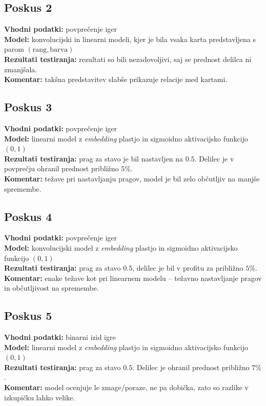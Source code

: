 \documentclass[a4paper,12pt]{article}
\begin{document}
\subsection{Poskus 2}
\textbf{Vhodni podatki:} povprečenje iger \\
\textbf{Model:} konvolucijski in linearni modeli, kjer je bila vsaka karta predstavljena s parom $(\text{rang}, \text{barva})$ \\
\textbf{Rezultati testiranja:} rezultati so bili nezadovoljivi, saj se prednost delilca ni zmanjšala. \\
\textbf{Komentar:} takšna predstavitev slabše prikazuje relacije med kartami.

\subsection{Poskus 3}
\textbf{Vhodni podatki:} povprečenje iger \\
\textbf{Model:} linearni model z \textit{embedding} plastjo in sigmoidno aktivacijsko funkcijo $(0,1)$ \\
\textbf{Rezultati testiranja:} prag za stavo je bil nastavljen na $0.5$. Delilec je v povprečju ohranil prednost približno $5\%$. \\
\textbf{Komentar:} težave pri nastavljanju pragov, model je bil zelo občutljiv na manjše spremembe.

\subsection{Poskus 4}
\textbf{Vhodni podatki:} povprečenje iger \\
\textbf{Model:} konvolucijski model z \textit{embedding} plastjo in sigmoidno aktivacijsko funkcijo $(0,1)$ \\
\textbf{Rezultati testiranja:} prag za stavo $0.5$, delilec je bil v profitu za približno $5\%$. \\
\textbf{Komentar:} enake težave kot pri linearnem modelu – težavno nastavljanje pragov in občutljivost na spremembe.

\subsection{Poskus 5}
\textbf{Vhodni podatki:} binarni izid igre \\
\textbf{Model:} linearni model z \textit{embedding} plastjo in sigmoidno aktivacijsko funkcijo $(0,1)$ \\
\textbf{Rezultati testiranja:} prag za stavo $0.5$. Delilec je ohranil prednost približno $7\%$. \\
\textbf{Komentar:} model ocenjuje le zmage/poraze, ne pa dobička, zato so razlike v izkupičku lahko velike.
\end{document}
